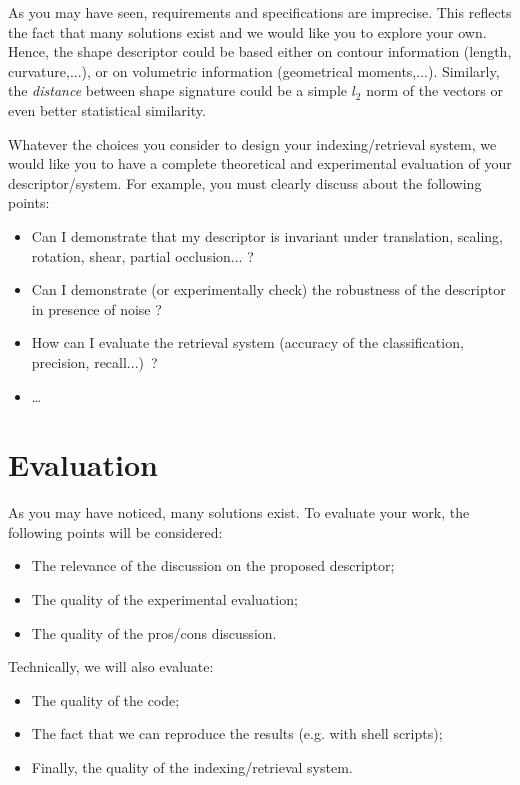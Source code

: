 \documentclass[a4paper, 11pt]{article}
\begin{document}
As you may have seen, requirements and specifications are
imprecise. This reflects the fact that many solutions exist and we
would like you to explore your own. Hence, the shape descriptor could
be based either on contour information (length, curvature,...), or on
volumetric information (geometrical moments,...). Similarly, the
\emph{distance} between shape signature could be a simple $l_2$ norm
of the vectors or even better statistical similarity.

Whatever the choices you consider to design your indexing/retrieval
system, we would like you to have a complete theoretical and
experimental evaluation of your descriptor/system. For example, you
must clearly discuss about the following points:
\begin{itemize}
\item Can I demonstrate that my descriptor is  invariant  under translation, scaling,
  rotation, shear, partial occlusion... ?
\item Can I demonstrate (or experimentally check) the robustness of
  the descriptor in presence of noise ?
\item How can I evaluate the retrieval system (accuracy of the
  classification, precision, recall...)~?
  \item \ldots
\end{itemize}

\section*{Evaluation}

As you may have noticed, many solutions exist. To evaluate your work,
the following points will be considered:
\begin{itemize}
\item The relevance of the discussion on the proposed descriptor;
\item The quality of the experimental evaluation;
\item The quality of the  pros/cons discussion.
\end{itemize}
Technically, we will also evaluate:
\begin{itemize}
\item The quality of the code;
\item The fact that we can reproduce the results (e.g. with shell scripts);
\item Finally, the quality of the indexing/retrieval system.
\end{itemize}
\end{document}
